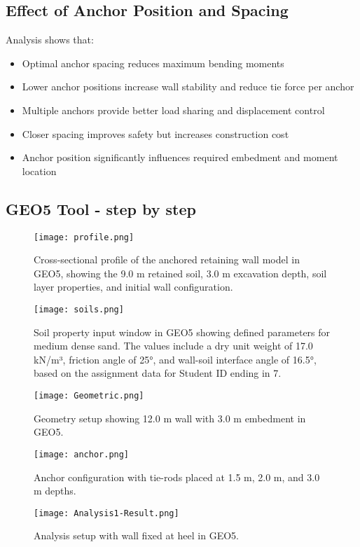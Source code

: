 \documentclass[10pt,a4paper,twocolumn]{article}
\begin{document}
\subsection{Effect of Anchor Position and Spacing}

Analysis shows that:
\begin{itemize}
\item Optimal anchor spacing reduces maximum bending moments
\item Lower anchor positions increase wall stability and reduce tie force per anchor
\item Multiple anchors provide better load sharing and displacement control
\item Closer spacing improves safety but increases construction cost
 \item Anchor position significantly influences required embedment and moment location


\end{itemize}

\subsection{GEO5 Tool - step by step}

\begin{figure}[htbp]
    \centering
    \texttt{[image: profile.png]}
    \caption{Cross-sectional profile of the anchored retaining wall model in GEO5, showing the 9.0 m retained soil, 3.0 m excavation depth, soil layer properties, and initial wall configuration.}
    \label{fig:moment_diagram}
\end{figure}

\begin{figure}[htbp]
    \centering
    \texttt{[image: soils.png]}
    \caption{Soil property input window in GEO5 showing defined parameters for medium dense sand. The values include a dry unit weight of 17.0 kN/m³, friction angle of 25°, and wall-soil interface angle of 16.5°, based on the assignment data for Student ID ending in 7.}
    \label{fig:soil_properties}
\end{figure}

\begin{figure}[htbp]
    \centering
    \texttt{[image: Geometric.png]}
    \caption{Geometry setup showing 12.0 m wall with 3.0 m embedment in GEO5.}
    \label{fig:wall_geometry}
\end{figure}

\begin{figure}[htbp]
    \centering
    \texttt{[image: anchor.png]}
    \caption{Anchor configuration with tie-rods placed at 1.5 m, 2.0 m, and 3.0 m depths.}
    \label{fig:anchor_setup}
\end{figure}
\begin{figure}[htbp]
    \centering
    \texttt{[image: Analysis1-Result.png]}
    \caption{Analysis setup with wall fixed at heel in GEO5.}
    \label{fig:wall_fixed_heel}
\end{figure}
\end{document}
